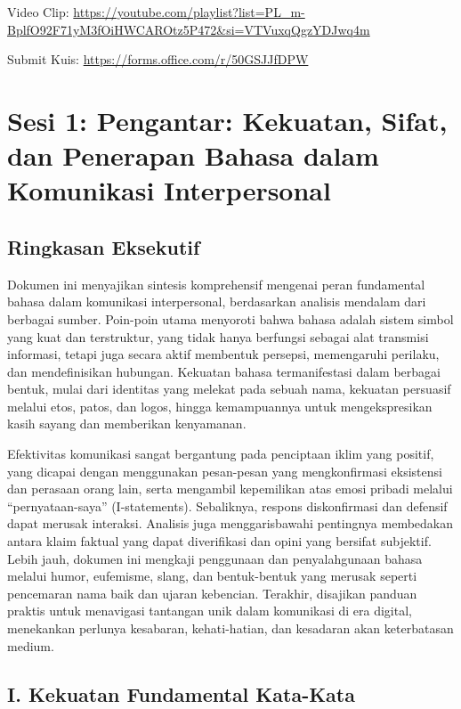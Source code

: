 \documentclass[
  letterpaper,
  DIV=11,
  numbers=noendperiod]{scrreprt}
\begin{document}
Video Clip:
\url{https://youtube.com/playlist?list=PL_m-BplfO92F71yM3fOiHWCAROtz5P472&si=VTVuxqQgzYDJwq4m}

Submit Kuis: \url{https://forms.office.com/r/50GSJJfDPW}

\section{Sesi 1: Pengantar: Kekuatan, Sifat, dan Penerapan Bahasa dalam
Komunikasi
Interpersonal}\label{sesi-1-pengantar-kekuatan-sifat-dan-penerapan-bahasa-dalam-komunikasi-interpersonal}

\subsection{Ringkasan Eksekutif}\label{ringkasan-eksekutif}

Dokumen ini menyajikan sintesis komprehensif mengenai peran fundamental
bahasa dalam komunikasi interpersonal, berdasarkan analisis mendalam
dari berbagai sumber. Poin-poin utama menyoroti bahwa bahasa adalah
sistem simbol yang kuat dan terstruktur, yang tidak hanya berfungsi
sebagai alat transmisi informasi, tetapi juga secara aktif membentuk
persepsi, memengaruhi perilaku, dan mendefinisikan hubungan. Kekuatan
bahasa termanifestasi dalam berbagai bentuk, mulai dari identitas yang
melekat pada sebuah nama, kekuatan persuasif melalui etos, patos, dan
logos, hingga kemampuannya untuk mengekspresikan kasih sayang dan
memberikan kenyamanan.

Efektivitas komunikasi sangat bergantung pada penciptaan iklim yang
positif, yang dicapai dengan menggunakan pesan-pesan yang mengkonfirmasi
eksistensi dan perasaan orang lain, serta mengambil kepemilikan atas
emosi pribadi melalui ``pernyataan-saya'' (I-statements). Sebaliknya,
respons diskonfirmasi dan defensif dapat merusak interaksi. Analisis
juga menggarisbawahi pentingnya membedakan antara klaim faktual yang
dapat diverifikasi dan opini yang bersifat subjektif. Lebih jauh,
dokumen ini mengkaji penggunaan dan penyalahgunaan bahasa melalui humor,
eufemisme, slang, dan bentuk-bentuk yang merusak seperti pencemaran nama
baik dan ujaran kebencian. Terakhir, disajikan panduan praktis untuk
menavigasi tantangan unik dalam komunikasi di era digital, menekankan
perlunya kesabaran, kehati-hatian, dan kesadaran akan keterbatasan
medium.

\subsection{I. Kekuatan Fundamental
Kata-Kata}\label{i.-kekuatan-fundamental-kata-kata}
\end{document}
